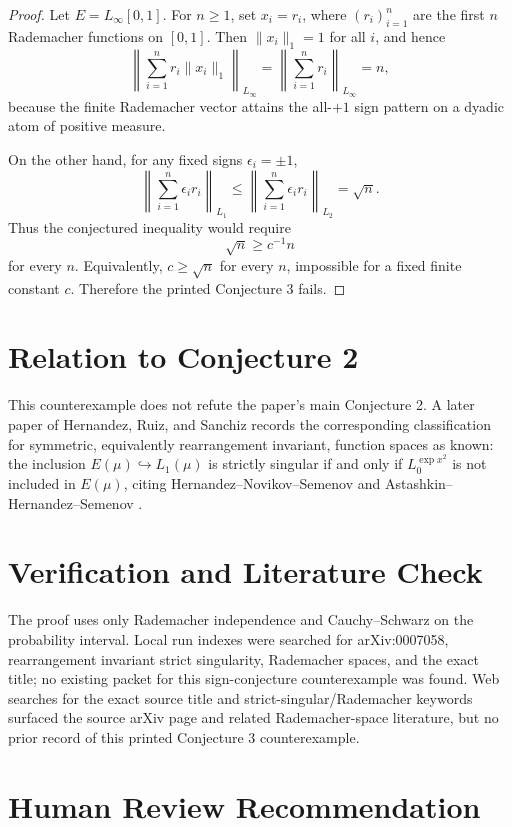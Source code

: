 \documentclass[11pt]{article}
\begin{document}
\begin{proof}
Let \(E=L_\infty[0,1]\). For \(n\ge 1\), set \(x_i=r_i\), where
\((r_i)_{i=1}^n\) are the first \(n\) Rademacher functions on \([0,1]\).
Then \(\|x_i\|_1=1\) for all \(i\), and hence
\[
\left\|\sum_{i=1}^n r_i\|x_i\|_1\right\|_{L_\infty}
=
\left\|\sum_{i=1}^n r_i\right\|_{L_\infty}
=n,
\]
because the finite Rademacher vector attains the all-\(+1\) sign pattern on
a dyadic atom of positive measure.

On the other hand, for any fixed signs \(\epsilon_i=\pm1\),
\[
\left\|\sum_{i=1}^n \epsilon_i r_i\right\|_{L_1}
\le
\left\|\sum_{i=1}^n \epsilon_i r_i\right\|_{L_2}
=\sqrt n.
\]
Thus the conjectured inequality would require
\[
\sqrt n \ge c^{-1}n
\]
for every \(n\). Equivalently, \(c\ge\sqrt n\) for every \(n\), impossible
for a fixed finite constant \(c\). Therefore the printed Conjecture 3 fails.
\end{proof}

\section*{Relation to Conjecture 2}

This counterexample does not refute the paper's main Conjecture 2. A later
paper of Hernandez, Ruiz, and Sanchiz records the corresponding classification
for symmetric, equivalently rearrangement invariant, function spaces as known:
the inclusion \(E(\mu)\hookrightarrow L_1(\mu)\) is strictly singular if and
only if \(L^{\exp x^2}_0\) is not included in \(E(\mu)\), citing
Hernandez--Novikov--Semenov and Astashkin--Hernandez--Semenov
\cite{hrs2406}.

\section*{Verification and Literature Check}

The proof uses only Rademacher independence and Cauchy--Schwarz on the
probability interval. Local run indexes were searched for arXiv:0007058,
rearrangement invariant strict singularity, Rademacher spaces, and the exact
title; no existing packet for this sign-conjecture counterexample was found.
Web searches for the exact source title and strict-singular/Rademacher
keywords surfaced the source arXiv page and related Rademacher-space
literature, but no prior record of this printed Conjecture 3 counterexample.

\section*{Human Review Recommendation}
\end{document}
